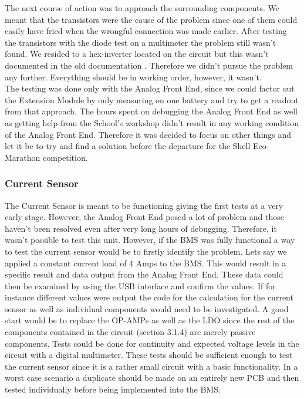 The next course of action was to approach the surrounding components. We meant that the transistors were the cause of the problem since one of them could easily have fried when the wrongful connection was made earlier. After testing the transistors with the diode test on a multimeter the problem still wasn't found. We resided to a hex-inverter located on the circuit but this wasn't documented in the old documentation \cite{BMSDocumentation}. Therefore we didn't pursue the problem any further. Everything should be in working order, however, it wasn't.\\
The testing was done only with the Analog Front End, since we could factor out the Extension Module by only measuring on one battery and try to get a readout from that approach. The hours spent on debugging the Analog Front End as well as getting help from the School's workshop didn't result in any working condition of the Analog Front End. Therefore it was decided to focus on other things and let it be to try and find a solution before the departure for the Shell Eco-Marathon competition.

\subsubsection{Current Sensor}
The Current Sensor is meant to be functioning giving the first tests at a very early stage. However, the Analog Front End posed a lot of problem and those haven't been resolved even after very long hours of debugging. Therefore, it wasn't possible to test this unit. However, if the BMS was fully functional a way to test the current sensor would be to firstly identify the problem. Lets say we applied a constant current load of 4 Amps to the BMS. This would result in a specific result and data output from the Analog Front End. These data could then be examined by using the USB interface and confirm the values. If for instance different values were output the code for the calculation for the current sensor as well as individual components would need to be investigated. A good start would be to replace the OP-AMPs as well as the LDO since the rest of the components contained in the circuit\cite{BMSDocumentation} (section 3.1.4) are merely passive components. Tests could be done for continuity and expected voltage levels in the circuit with a digital multimeter. These tests should be sufficient enough to test the current sensor since it is a rather small circuit with a basic functionality. In a worst case scenario a duplicate should be made on an entirely new PCB and then tested individually before being implemented into the BMS.    


